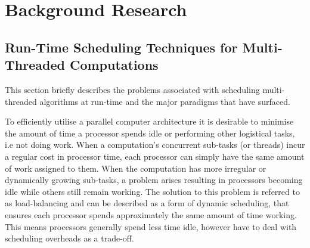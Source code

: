 


\chapter{Background Research}
\label{ch:backres}

\section{Run-Time Scheduling Techniques for Multi-Threaded Computations}
This section briefly describes the problems associated with \gls{scheduling} \glspl{multi-threaded algorithm} at run-time and
the major paradigms that have surfaced.

To efficiently utilise a parallel computer architecture it is desirable to minimise
the amount of time a processor spends idle or performing other logistical tasks, i.e not doing work. 
When a computation's concurrent sub-tasks (or \glspl{thread}) incur a regular cost in processor
time, each processor can simply have the same amount of work assigned to them. When the computation has
more irregular or dynamically growing sub-tasks, a problem arises resulting in 
processors becoming idle while others still remain working. The solution to this problem is referred to as
\gls{load-balancing} and can be described as a form of dynamic scheduling, that ensures each processor 
spends approximately the same amount of time working. This means processors generally spend
less time idle, however have to deal with scheduling overheads as a trade-off.

